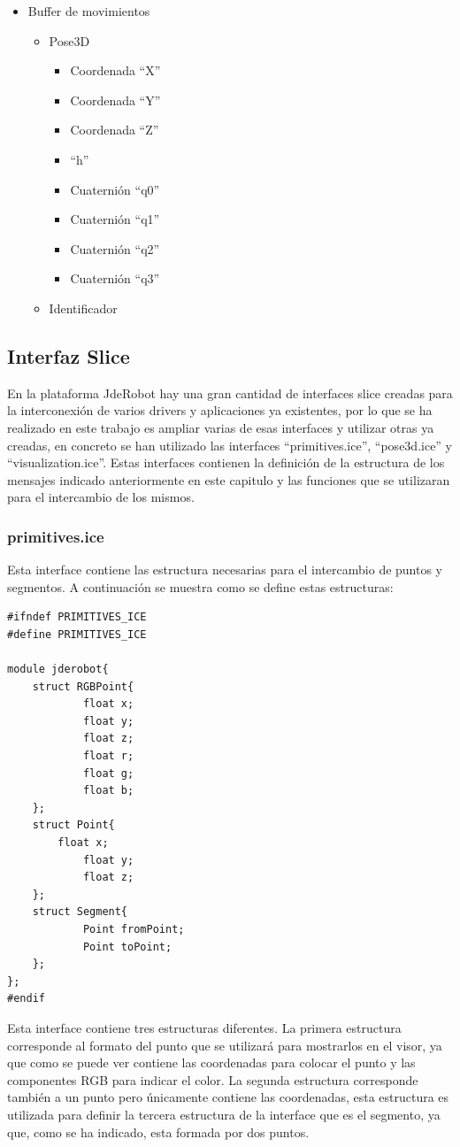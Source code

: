 \begin{itemize}
	\item Buffer de movimientos
	\begin{itemize}
		\item	Pose3D
		\begin{itemize}
			\item Coordenada ``X''
			\item Coordenada ``Y''
			\item Coordenada ``Z''
			\item ``h''
			\item Cuaternión ``q0''
			\item Cuaternión ``q1''
			\item Cuaternión ``q2''
			\item Cuaternión ``q3''
		\end{itemize}
		\item Identificador
	\end{itemize}
\end{itemize}

\subsection{Interfaz Slice}
En la plataforma JdeRobot hay una gran cantidad de interfaces slice creadas para la interconexión de varios drivers y aplicaciones ya existentes, por lo que se ha realizado en este trabajo es ampliar varias de esas interfaces y utilizar otras ya creadas, en concreto se han utilizado las interfaces ``primitives.ice'', ``pose3d.ice'' y ``visualization.ice''. Estas interfaces contienen la definición de la estructura de los mensajes indicado anteriormente en este capitulo y las funciones que se utilizaran para el intercambio de los mismos.

\subsubsection{primitives.ice}
Esta interface contiene las estructura necesarias para el intercambio de puntos y segmentos. A continuación se muestra como se define estas estructuras:

\begin{lstlisting}[frame=single]
#ifndef PRIMITIVES_ICE
#define PRIMITIVES_ICE

module jderobot{
	struct RGBPoint{
      		float x;
      		float y;
      		float z;
      		float r;
      		float g;
      		float b;
	};
	struct Point{
		float x;
	    	float y;
	    	float z;
	};
	struct Segment{
	    	Point fromPoint;
	    	Point toPoint;
	};
};
#endif
\end{lstlisting}
Esta interface contiene tres estructuras diferentes. La primera estructura corresponde al formato del punto que se utilizará para mostrarlos en el visor, ya que como se puede ver contiene las coordenadas para colocar el punto y las componentes RGB para indicar el color. La segunda estructura corresponde también a un punto pero únicamente contiene las coordenadas, esta estructura es utilizada para definir la tercera estructura de la interface que es el segmento, ya que, como se ha indicado, esta formada por dos puntos. 

